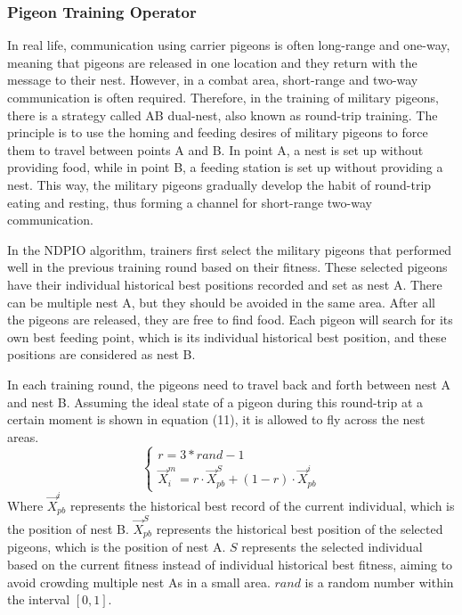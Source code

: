 \documentclass[preprint,review,compress,12pt]{elsarticle}
\begin{document}
\subsubsection{Pigeon Training Operator}

In real life, communication using carrier pigeons is often long-range and one-way, meaning that pigeons are released in one location and they return with the message to their nest. However, in a combat area, short-range and two-way communication is often required. Therefore, in the training of military pigeons, there is a strategy called AB dual-nest, also known as round-trip training. The principle is to use the homing and feeding desires of military pigeons to force them to travel between points A and B. In point A, a nest is set up without providing food, while in point B, a feeding station is set up without providing a nest. This way, the military pigeons gradually develop the habit of round-trip eating and resting, thus forming a channel for short-range two-way communication.

In the NDPIO algorithm, trainers first select the military pigeons that performed well in the previous training round based on their fitness. These selected pigeons have their individual historical best positions recorded and set as nest A. There can be multiple nest A, but they should be avoided in the same area. After all the pigeons are released, they are free to find food. Each pigeon will search for its own best feeding point, which is its individual historical best position, and these positions are considered as nest B.

In each training round, the pigeons need to travel back and forth between nest A and nest B. Assuming the ideal state of a pigeon during this round-trip at a certain moment is shown in equation (11), it is allowed to fly across the nest areas.
\begin{equation}
    \left\{ {\begin{array}{ccccccccccccccc}{r = 3*rand - 1}\\{\vec{X}_i^m = r \cdot \vec{X}_{pb}^S + (1 - r) \cdot \vec{X}_{pb}^i}\end{array}} \right.
\end{equation}
Where $\vec{X}_{pb}^i$ represents the historical best record of the current individual, which is the position of nest B. $\vec{X}_{pb}^S$ represents the historical best position of the selected pigeons, which is the position of nest A. $S$ represents the selected individual based on the current fitness instead of individual historical best fitness, aiming to avoid crowding multiple nest As in a small area. $rand$ is a random number within the interval $[0,1]$.
\end{document}
